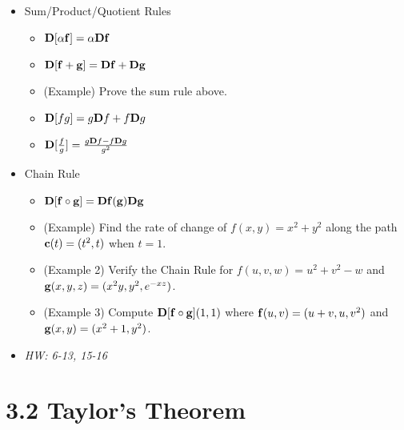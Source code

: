 \documentclass[11pt]{article}
\begin{document}
\begin{itemize}
  \item Sum/Product/Quotient Rules
    \begin{itemize}
      \item \(\mathbf{D}[\alpha \mathbf{f}]=\alpha\mathbf{D}\mathbf{f}\)
      \item \(\mathbf{D}[\mathbf{f}+\mathbf{g}]=\mathbf{D}\mathbf{f}+\mathbf{D}\mathbf{g}\)
      \item (Example) Prove the sum rule above.
      \item
        \(
          \mathbf{D}[fg]=g\mathbf{D}f + f\mathbf{D}g
        \)
      \item
        \(
          \mathbf{D}[\frac{f}{g}]
            =
          \frac{
            g\mathbf{D}f - f\mathbf{D}g
          }{
            g^2
          }
        \)
    \end{itemize}
  \item Chain Rule
    \begin{itemize}
      \item
        \(
          \mathbf{D} [\mathbf{f}\circ \mathbf{g}]
            =
          \mathbf{D}\mathbf{f}(\mathbf{g})\mathbf{D}\mathbf{g}
        \)
      \item
        (Example) Find the rate of change of \(f(x,y)=x^2+y^2\) along
        the path \(\mathbf{c}(t)=(t^2,t)\) when \(t=1\).
      \item
        (Example 2) Verify the Chain Rule for \(f(u,v,w)=u^2+v^2-w\)
        and \(\mathbf{g}(x,y,z)=(x^2y,y^2,e^{-xz})\).
      \item
        (Example 3) Compute \(\mathbf{D}[\mathbf{f}\circ\mathbf{g}](1,1)\) where
        \(\mathbf{f}(u,v)=(u+v,u,v^2)\) and \(\mathbf{g}(x,y)=(x^2+1,y^2)\).
    \end{itemize}
  \item\textit{
    HW: 6-13, 15-16
  }
\end{itemize}


\section*{3.2 Taylor's Theorem}
\end{document}
